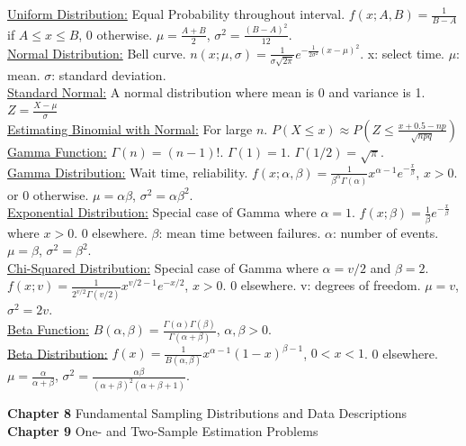 \documentclass[9pt]{article}
\begin{document}
    \begin{multicols}{2}
        \noindent\uline{Uniform Distribution:} Equal Probability throughout interval. $f(x; A,B)=\frac{1}{B-A}$ if $A\leq x \leq B$,
        0 otherwise. $\mu=\frac{A+B}{2}$, $\sigma^2=\frac{(B-A)^2}{12}$.\\
        \uline{Normal Distribution:} Bell curve. $n(x;\mu,\sigma)=\frac{1}{\sigma\sqrt{2\pi}}e^{-\frac{1}{2\sigma^2}(x-\mu)^2}$.
        x: select time. $\mu$: mean. $\sigma$: standard deviation.\\
        \uline{Standard Normal:} A normal distribution where mean is 0 and variance is 1.
        $Z=\frac{X-\mu}{\sigma}$\\
        \uline{Estimating Binomial with Normal:} For large $n$. $P(X\leq x) \approx P(Z\leq \frac{x+0.5-np}{\sqrt{npq}})$\\
        \uline{Gamma Function:} $\Gamma(n) = (n-1)!$. $\Gamma(1)=1$. $\Gamma(1/2)=\sqrt{\pi}$.\\
        \uline{Gamma Distribution:} Wait time, reliability. $f(x;\alpha,\beta)=\frac{1}{\beta^{\alpha}\Gamma(\alpha)}x^{\alpha-1}e^{-\frac{x}{\beta}}$, $x>0$.
        or 0 otherwise. $\mu=\alpha\beta$, $\sigma^2=\alpha\beta^2$.\\
        \uline{Exponential Distribution:} Special case of Gamma where $\alpha=1$. $f(x;\beta)=\frac{1}{\beta}e^{-\frac{x}{\beta}}$ where $x>0$. 0 elsewhere. $\beta$: 
        mean time between failures. $\alpha$: number of events. $\mu=\beta$, $\sigma^2=\beta^2$.\\
        \uline{Chi-Squared Distribution:} Special case of Gamma where $\alpha=v/2$ and $\beta=2$.
        $f(x;v)=\frac{1}{2^{v/2}\Gamma(v/2)}x^{v/2-1}e^{-x/2}$, $x>0$. 0 elsewhere. v: degrees of freedom. $\mu=v$,
        $\sigma^2=2v$.\\
        \uline{Beta Function:} $B(\alpha,\beta)=\frac{\Gamma(\alpha)\Gamma(\beta)}{\Gamma(\alpha+\beta)}$, $\alpha,\beta >0$.\\
        \uline{Beta Distribution:} $f(x)=\frac{1}{B(\alpha,\beta)}x^{\alpha-1}(1-x)^{\beta-1}$, $0<x<1$. 0 elsewhere.
        $\mu=\frac{\alpha}{\alpha+\beta}$, $\sigma^2=\frac{\alpha\beta}{(\alpha+\beta)^2(\alpha+\beta+1)}$.
    \end{multicols}
    \noindent\textbf{Chapter 8} Fundamental Sampling Distributions and Data Descriptions
    \noindent\textbf{Chapter 9} One- and Two-Sample Estimation Problems
\end{document}
